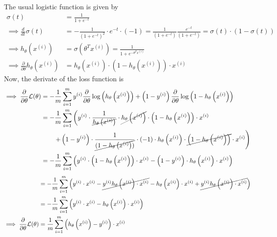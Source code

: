 The usual logistic function is given by
\begin{align*}
    \sigma\left(t\right)
     & =
    \frac{1}{1+e^{-t}}
    \\
    \implies
    \frac{d}{dt} \sigma\left(t\right)
     & =
    -\frac{1}{{\left(1+e^{-t}\right)}^2} \cdot e^{-t} \cdot (-1)
    =
    \frac{1}{\left(1+e^{-t}\right)}
    \frac{e^{-t}}{\left(1+e^{-t}\right)}
    =
    \sigma\left(t\right) \cdot \left(1-\sigma\left(t\right)\right)
    \\
    \implies
    h_{\theta}\left(x^{(i)}\right)
     & =
    \sigma\left(\theta^{T} x^{(i)}\right)
    =
    \frac{1}{1+e^{-\theta^{T} x^{(i)}}}
    \\
    \implies
    \frac{\partial}{\partial \theta} h_{\theta}\left(x^{(i)}\right)
     & =
    h_{\theta}\left(x^{(i)}\right) \cdot \left(1-h_{\theta}\left(x^{(i)}\right)\right) \cdot x^{(i)}
\end{align*}
Now, the derivate of the loss function is
\begin{align*}
    \implies
    \frac{\partial}{\partial \theta} \mathcal{L}(\theta)
     & =
    -\frac{1}{m} \sum_{i=1}^{m}
    y^{(i)} \frac{\partial}{\partial \theta} \log \left(h_{\theta}\left(x^{(i)}\right)\right)
    +
    \left(1-y^{(i)}\right) \frac{\partial}{\partial \theta} \log \left(1-h_{\theta}\left(x^{(i)}\right)\right)
    \\ & =
    -\frac{1}{m} \sum_{i=1}^{m}
    \left(
    y^{(i)}
    \cdot \frac{1}{\cancel{h_{\theta}\left(x^{(i)}\right)}}
    \cdot \cancel{h_{\theta}\left(x^{(i)}\right)}
    \cdot \left(1-h_{\theta}\left(x^{(i)}\right)\right)
    \cdot x^{(i)}
    \right.
    \\ & \qquad
    \left.
    +
    \left(1-y^{(i)}\right)
    \cdot \frac{1}{\cancel{(1-h_{\theta}\left(x^{(i)}\right))}}
    \cdot (-1)
    \cdot h_{\theta}\left(x^{(i)}\right)
    \cdot \cancel{\left(1-h_{\theta}\left(x^{(i)}\right)\right)}
    \cdot x^{(i)}
    \right)
    \\ & =
    -\frac{1}{m} \sum_{i=1}^{m}
    \left(
    y^{(i)} \cdot \left(1-h_{\theta}\left(x^{(i)}\right)\right) \cdot x^{(i)}
    -
    \left(1-y^{(i)}\right) \cdot h_{\theta}\left(x^{(i)}\right) \cdot x^{(i)}
    \right)
\end{align*}
\begin{align*}
     & =
    -\frac{1}{m} \sum_{i=1}^{m}
    \Big(
    y^{(i)} \cdot x^{(i)}
    -
    \cancel{y^{(i)} h_{\theta}\left(x^{(i)}\right) \cdot x^{(i)}}
    -
    h_{\theta}\left(x^{(i)}\right) \cdot x^{(i)}
    +
    \cancel{y^{(i)} h_{\theta}\left(x^{(i)}\right) \cdot x^{(i)}}
    \Big)
    \\ & =
    -\frac{1}{m} \sum_{i=1}^{m}
    \left(
    y^{(i)} \cdot x^{(i)}
    -
    h_{\theta}\left(x^{(i)}\right) \cdot x^{(i)}
    \right)
    \\
    \implies
    \frac{\partial}{\partial \theta} \mathcal{L}(\theta)
     & =
    \frac{1}{m} \sum_{i=1}^{m}
    \left(
    h_{\theta}\left(x^{(i)}\right)
    -
    y^{(i)}
    \right)
    \cdot x^{(i)}
\end{align*}

